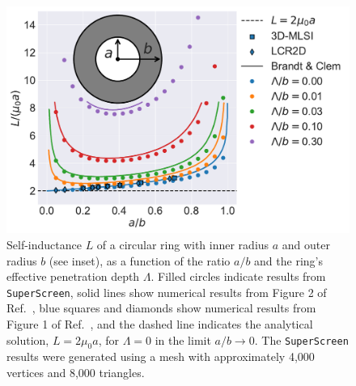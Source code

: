 \documentclass[final,3p,times,twocolumn]{elsarticle}
\newcommand{\inline}[1]{\texttt{#1}\xspace}
\newcommand{\SuperScreen}{\inline{SuperScreen}}
\begin{document}
\begin{figure}
    \centering
    \includegraphics[width=\linewidth]{examples/images/inductance.pdf}
    \caption{Self-inductance $L$ of a circular ring with inner radius $a$ and outer radius $b$ (see inset), as a function of the ratio $a / b$ and the ring's effective penetration depth $\Lambda$. Filled circles indicate results from \SuperScreen, solid lines show numerical results from Figure 2 of Ref.~\cite{Brandt2004-ew}, blue squares and diamonds show numerical results from Figure 1 of Ref.~\cite{Khapaev1997-kw}, and the dashed line indicates the analytical solution, $L = 2\mu_0 a$, for $\Lambda=0$ in the limit $a/b\to 0$\cite{Ketchen2012-mb, Babaei_Brojeny2003-la}. The \SuperScreen results were generated using a mesh with approximately 4,000 vertices and 8,000 triangles.}
    \label{fig:inductance}
\end{figure}
\end{document}
